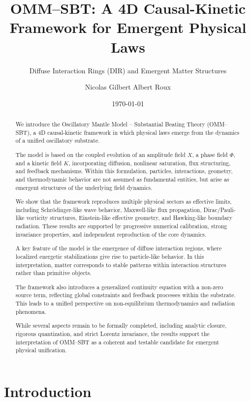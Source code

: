 \documentclass[11pt]{article}
\title{OMM--SBT: A 4D Causal-Kinetic Framework for Emergent Physical Laws}
\subtitle{Diffuse Interaction Rings (DIR) and Emergent Matter Structures}
\author{
Nicolas Gilbert Albert Roux
}
\date{\today}
\begin{document}
\maketitle

\begin{abstract}

We introduce the Oscillatory Mantle Model -- Substantial Beating Theory (OMM--SBT), a 4D causal-kinetic framework in which physical laws emerge from the dynamics of a unified oscillatory substrate.

The model is based on the coupled evolution of an amplitude field $X$, a phase field $\Phi$, and a kinetic field $K$, incorporating diffusion, nonlinear saturation, flux structuring, and feedback mechanisms. Within this formulation, particles, interactions, geometry, and thermodynamic behavior are not assumed as fundamental entities, but arise as emergent structures of the underlying field dynamics.

We show that the framework reproduces multiple physical sectors as effective limits, including Schrödinger-like wave behavior, Maxwell-like flux propagation, Dirac/Pauli-like vorticity structures, Einstein-like effective geometry, and Hawking-like boundary radiation. These results are supported by progressive numerical calibration, strong invariance properties, and independent reproduction of the core dynamics.

A key feature of the model is the emergence of diffuse interaction regions, where localized energetic stabilizations give rise to particle-like behavior. In this interpretation, matter corresponds to stable patterns within interaction structures rather than primitive objects.

The framework also introduces a generalized continuity equation with a non-zero source term, reflecting global constraints and feedback processes within the substrate. This leads to a unified perspective on non-equilibrium thermodynamics and radiation phenomena.

While several aspects remain to be formally completed, including analytic closure, rigorous quantization, and strict Lorentz invariance, the results support the interpretation of OMM--SBT as a coherent and testable candidate for emergent physical unification.

\end{abstract}

\section{Introduction}
\end{document}

